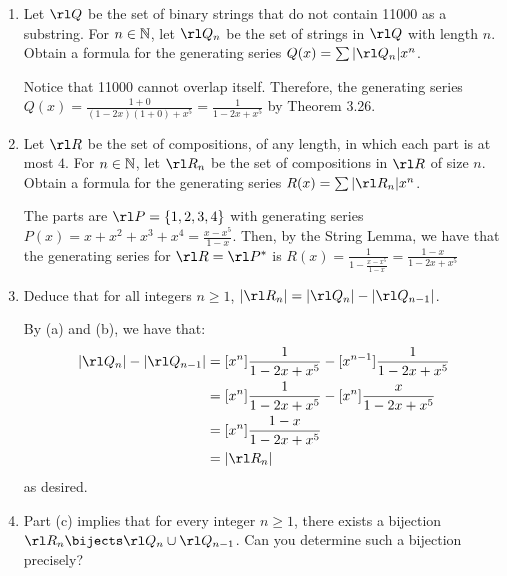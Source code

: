 \begin{xca}\end{xca}
\begin{enumerate}
  \item Let $\rl Q$ be the set of binary strings that do not contain 11000 as a substring.
        For $n \in \mathbb{N}$, let $\rl Q_n$ be the set of strings in $\rl Q$ with length $n$.
        Obtain a formula for the generating series $Q(x) = \sum \abs{\rl Q_n}x^n$.
        \begin{sol}
          Notice that 11000 cannot overlap itself.
          Therefore, the generating series $Q(x) = \frac{1+0}{(1-2x)(1+0)+x^5} = \frac{1}{1-2x+x^5}$
          by Theorem 3.26.
        \end{sol}
  \item Let $\rl R$ be the set of compositions, of any length,
        in which each part is at most $4$.
        For $n \in \mathbb{N}$, let $\rl R_n$
        be the set of compositions in $\rl R$ of size $n$.
        Obtain a formula for the generating series $R(x) = \sum \abs{\rl R_n}x^n$.
        \begin{sol}
          The parts are $\rl P = \{1,2,3,4\}$ with generating series
          $P(x) = x + x^2 + x^3 + x^4 = \frac{x-x^5}{1-x}$.
          Then, by the String Lemma, we have that the generating series for $\rl R = \rl P^*$
          is $R(x) = \frac{1}{1-\frac{x-x^5}{1-x}} = \frac{1-x}{1-2x+x^5}$
        \end{sol}
  \item Deduce that for all integers $n \geq 1$, $\abs{\rl R_n} = \abs{\rl Q_n} - \abs{\rl Q_{n-1}}$.
        \begin{prf}
          By (a) and (b), we have that:
          \begin{align*}
            \abs{\rl Q_n} - \abs{\rl Q_{n-1}}
             & = [x^n]\frac{1}{1-2x+x^5} - [x^{n-1}]\frac{1}{1-2x+x^5} \\
             & = [x^n]\frac{1}{1-2x+x^5} - [x^n]\frac{x}{1-2x+x^5}     \\
             & = [x^n]\frac{1-x}{1-2x+x^5}                             \\
             & = \abs{\rl R_n}
          \end{align*}
          as desired.
        \end{prf}
  \item Part (c) implies that for every integer $n \geq 1$,
        there exists a bijection $\rl R_n \bijects \rl Q_n \cup \rl Q_{n-1}$.
        Can you determine such a bijection precisely?
\end{enumerate}

